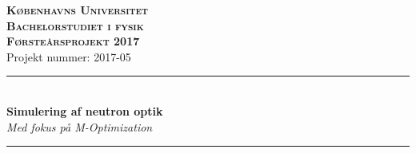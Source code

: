 \documentclass[12pt,oneside,a4paper]{article}
\begin{document}


\begin{center}
    {\textsc {\LARGE \bf{Københavns Universitet \\[0.3cm]  Bachelorstudiet i fysik}}}\\[1.5cm]
    {\textsc {\Large \bf Førsteårsprojekt 2017}}\\[0.8cm]
    {\Large Projekt nummer: 2017-05}\\[1cm]
    
    \rule{15cm}{0.01cm}\\[1cm]
    {\LARGE\bf  Simulering af neutron optik} \\ {\it Med fokus på M-Optimization}\\ [0.5cm]
    \rule{15cm}{0.01cm}\\[1cm]
\end{center}
\end{document}
